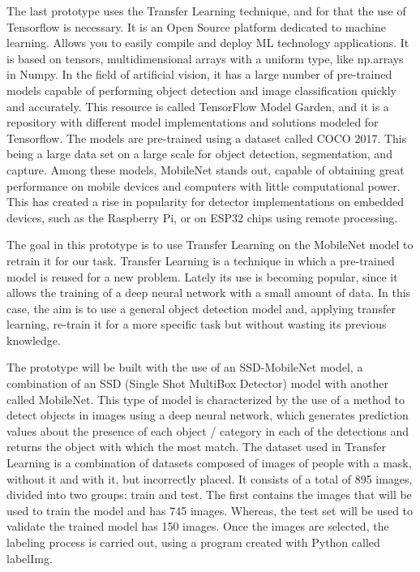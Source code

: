 \vspace{-0.3cm}
The last prototype uses the Transfer Learning technique, and for that the use of Tensorflow is necessary. It is an Open Source platform dedicated to machine learning. Allows you to easily compile and deploy ML technology applications. It is based on tensors, multidimensional arrays with a uniform type, like np.arrays in Numpy. In the field of artificial vision, it has a large number of pre-trained models capable of performing object detection and image classification quickly and accurately. This resource is called TensorFlow Model Garden, and it is a repository with different model implementations and solutions modeled for Tensorflow. The models are pre-trained using a dataset called COCO 2017. This being a large data set on a large scale for object detection, segmentation, and capture. Among these models, MobileNet stands out, capable of obtaining great performance on mobile devices and computers with little computational power. This has created a rise in popularity for detector implementations on embedded devices, such as the Raspberry Pi, or on ESP32 chips using remote processing.

\vspace{-0.3cm}
The goal in this prototype is to use Transfer Learning on the MobileNet model to retrain it for our task. Transfer Learning is a technique in which a pre-trained model is reused for a new problem. Lately its use is becoming popular, since it allows the training of a deep neural network with a small amount of data. In this case, the aim is to use a general object detection model and, applying transfer learning, re-train it for a more specific task but without wasting its previous knowledge. 

\vspace{-0.3cm}
The prototype will be built with the use of an SSD-MobileNet model, a combination of an SSD (Single Shot MultiBox Detector) model with another called MobileNet. This type of model is characterized by the use of a method to detect objects in images using a deep neural network, which generates prediction values about the presence of each object / category in each of the detections and returns the object with which the most match. The dataset used in Transfer Learning is a combination of datasets composed of images of people with a mask, without it and with it, but incorrectly placed. It consists of a total of 895 images, divided into two groups: train and test. The first contains the images that will be used to train the model and has 745 images. Whereas, the test set will be used to validate the trained model has 150 images. Once the images are selected, the labeling process is carried out, using a program created with Python called labelImg. 

